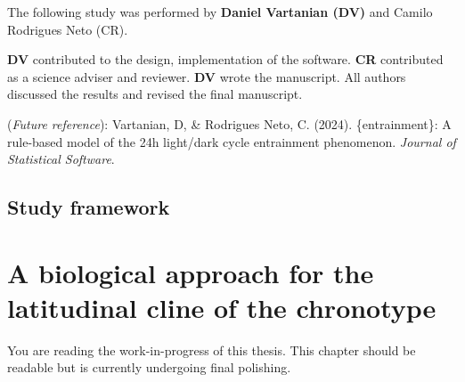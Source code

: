 \documentclass[
  12pt,
  a4paper,
  oneside]{tesesusp}
\begin{document}
\begin{tcolorbox}[enhanced jigsaw, breakable, colback=white, colbacktitle=quarto-callout-note-color!10!white, leftrule=.75mm, left=2mm, toprule=.15mm, opacityback=0, rightrule=.15mm, title=\textcolor{quarto-callout-note-color}{\faInfo}\hspace{0.5em}{Note}, opacitybacktitle=0.6, bottomtitle=1mm, titlerule=0mm, toptitle=1mm, coltitle=black, colframe=quarto-callout-note-color-frame, bottomrule=.15mm, arc=.35mm]

The following study was performed by \textbf{Daniel Vartanian (DV)} and
Camilo Rodrigues Neto (CR).

\textbf{DV} contributed to the design, implementation of the software.
\textbf{CR} contributed as a science adviser and reviewer. \textbf{DV}
wrote the manuscript. All authors discussed the results and revised the
final manuscript.

(\emph{Future reference}): Vartanian, D, \& Rodrigues Neto, C. (2024).
\{entrainment\}: A rule-based model of the 24h light/dark cycle
entrainment phenomenon. \emph{Journal of Statistical Software}.

\end{tcolorbox}

\vspace{10pt}

\hypertarget{study-framework-3}{%
\section{Study framework}\label{study-framework-3}}

\hypertarget{a-biological-approach-for-the-latitudinal-cline-of-the-chronotype}{%
\chapter{A biological approach for the latitudinal cline of the
chronotype}\label{a-biological-approach-for-the-latitudinal-cline-of-the-chronotype}}

\begin{tcolorbox}[enhanced jigsaw, breakable, colback=white, colbacktitle=quarto-callout-note-color!10!white, leftrule=.75mm, left=2mm, toprule=.15mm, opacityback=0, rightrule=.15mm, title=\textcolor{quarto-callout-note-color}{\faInfo}\hspace{0.5em}{Note}, opacitybacktitle=0.6, bottomtitle=1mm, titlerule=0mm, toptitle=1mm, coltitle=black, colframe=quarto-callout-note-color-frame, bottomrule=.15mm, arc=.35mm]

You are reading the work-in-progress of this thesis. This chapter should
be readable but is currently undergoing final polishing.

\end{tcolorbox}
\end{document}
